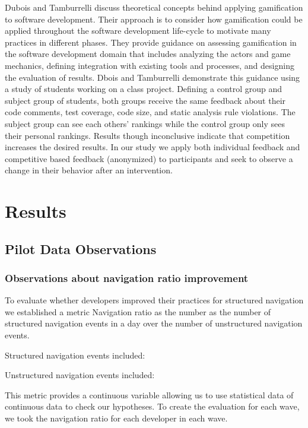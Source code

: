\documentclass{sig-alternate}
\begin{document}
Dubois and Tamburrelli discuss theoretical concepts behind applying gamification to software development. \cite{Dubois2013Understanding} Their approach is to consider how gamification could be applied throughout the software development life-cycle to motivate many practices in different phases.  They provide guidance on assessing gamification in the software development domain that includes analyzing the actors and game mechanics, defining integration with existing tools and processes, and designing the evaluation of results.  Dbois and Tamburrelli demonstrate this guidance using a study of students working on a class project.  Defining a control group and subject group of students, both groups receive the same feedback about their code comments, test coverage, code size, and static analysis rule violations.  The subject group can see each others' rankings while the control group only sees their personal rankings.  Results though inconclusive indicate that competition increases the desired results.  In our study we apply both individual feedback and competitive based feedback (anonymized) to participants and seek to observe a change in their behavior after an intervention.


\section{Results}

\subsection{Pilot Data Observations}

\subsubsection{Observations about navigation ratio improvement}

To evaluate whether developers improved their practices for structured navigation we established a metric Navigation ratio as the number as the number of structured navigation events in a day over the number of unstructured navigation events.  

Structured navigation events included:

Unstructured navigation events included:

This metric provides a continuous variable allowing us to use statistical data of continuous data to check our hypotheses.  To create the evaluation for each wave, we took the navigation ratio for each developer in each wave.
\end{document}
